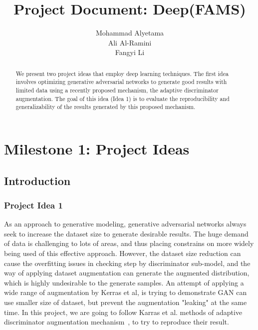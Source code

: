 \documentclass{report}
\title{Project Document: Deep(FAMS)}
\author{Mohammad Alyetama \\
Ali Al-Ramini \\
Fangyi Li }
\date{}
\begin{document}
\maketitle

\tableofcontents

\begin{abstract}
We present two project ideas that employ deep learning techniques. The first idea involves optimizing generative adversarial networks to generate good results with limited data using a recently proposed mechanism, the adaptive discriminator augmentation. The goal of this idea (Idea 1) is to evaluate the reproducibility and generalizability of the results generated by this proposed mechanism.
\end{abstract}

\chapter{Milestone 1: Project Ideas}

\section{Introduction}

\subsection{Project Idea 1}

As an approach to generative modeling, generative adversarial networks always seek to increase the dataset size to generate desirable results. The huge demand of data is challenging to lots of areas, and thus placing constrains on more widely being used of this effective approach. However, the dataset size reduction can cause the overfitting issues in checking step by discriminator sub-model, and the way of applying dataset augmentation can generate the augmented distribution, which is highly undesirable to the generate samples.
An attempt of applying a wide range of augmentation by Kerras et al, is trying to demonstrate GAN can use smaller size of dataset, but prevent the augmentation "leaking" at the same time. In this project, we are going to follow Karras et al. methods of adaptive discriminator augmentation mechanism~\cite{karras2020training}, to try to reproduce their result.
\end{document}
